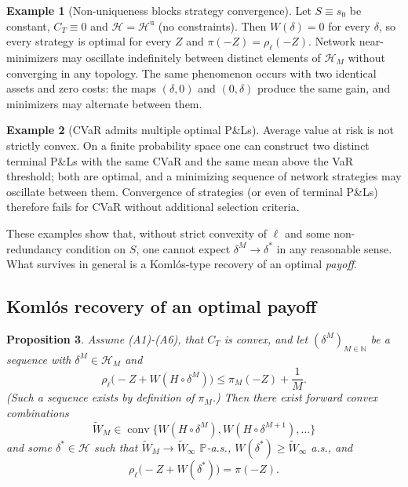 \documentclass[11pt,a4paper]{report}
\numberwithin{equation}{chapter}
\theoremstyle{plain}
\newtheorem{proposition}{Proposition}[chapter]
\theoremstyle{definition}
\newtheorem{example}[proposition]{Example}
\newcommand{\PP}{\mathbb{P}}
\newcommand{\N}{\mathbb{N}}
\newcommand{\HH}{\mathcal{H}}
\newcommand{\Hu}{\mathcal{H}^{\mathrm{u}}}
\begin{document}
\begin{example}[Non-uniqueness blocks strategy convergence]\label{ex:nonunique}
    Let $S\equiv s_0$ be constant, $C_T\equiv0$ and $\HH=\Hu$ (no constraints). Then $W(\delta)=0$ for every $\delta$, so every strategy is optimal for every $Z$ and $\pi(-Z)=\rho_\ell(-Z)$. Network near-minimizers may oscillate indefinitely between distinct elements of $\HH_M$ without converging in any topology. The same phenomenon occurs with two identical assets and zero costs: the maps $(\delta,0)$ and $(0,\delta)$ produce the same gain, and minimizers may alternate between them.
\end{example}

\begin{example}[CVaR admits multiple optimal P\&Ls]\label{ex:cvar-nonunique}
    Average value at risk is not strictly convex. On a finite probability space one can construct two distinct terminal P\&Ls with the same CVaR and the same mean above the VaR threshold; both are optimal, and a minimizing sequence of network strategies may oscillate between them. Convergence of strategies (or even of terminal P\&Ls) therefore fails for CVaR without additional selection criteria.
\end{example}

These examples show that, without strict convexity of $\ell$ and some non-redundancy condition on $S$, one cannot expect $\delta^M\to\delta^*$ in any reasonable sense. What survives in general is a Koml\'os-type recovery of an optimal \emph{payoff}.

\subsection*{Koml\'os recovery of an optimal payoff}

\begin{proposition}\label{prop:komlos-networks}
    Assume \textup{(A1)}-\textup{(A6)}, that $C_T$ is convex, and let $(\delta^M)_{M\in\N}$ be a sequence with $\delta^M\in\HH_M$ and
    \[
        \rho_\ell\bigl(-Z+W(H\circ\delta^M)\bigr)\le\pi_M(-Z)+\frac1M.
    \]
    (Such a sequence exists by definition of $\pi_M$.) Then there exist forward convex combinations
    \[
        \widetilde W_M\in\operatorname{conv}\bigl\{W(H\circ\delta^M),W(H\circ\delta^{M+1}),\dots\bigr\}
    \]
    and some $\delta^*\in\HH$ such that $\widetilde W_M\to\widetilde W_\infty$ $\PP$-a.s., $W(\delta^*)\ge\widetilde W_\infty$ a.s., and
    \[
        \rho_\ell\bigl(-Z+W(\delta^*)\bigr)=\pi(-Z).
    \]
\end{proposition}
\end{document}
